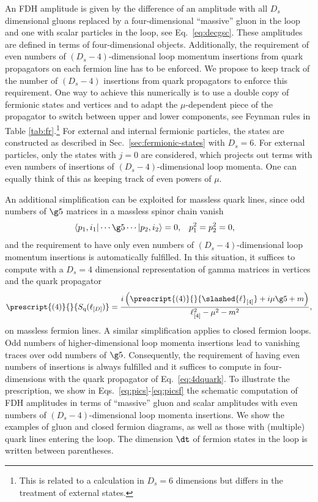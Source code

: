 An FDH amplitude is given by the difference
of an amplitude with all $D_s$ dimensional gluons replaced by a four-dimensional
``massive'' gluon in the loop and one
with scalar particles in the loop, see Eq.~\eqref{eq:decgsc}. These amplitudes are defined in
terms of four-dimensional objects. Additionally, the requirement of even numbers of $(D_s-4)$-dimensional loop momentum insertions
from quark propagators on each fermion line has to be enforced. We propose to
keep track of the number of $(D_s-4)$ insertions from quark
propagators to enforce this requirement. One way to achieve this
numerically is to use a double copy of fermionic states and vertices
and to adapt the $\mu$-dependent piece of the propagator to switch
between upper and lower components, see Feynman rules in Table \ref{tab:fr}.\footnote{This
  is related to a calculation in $D_s=6$ dimensions but
  differs in the treatment of external states.} For external and
  internal fermionic particles, the states are constructed as described in
  Sec.~\ref{sec:fermionic-states} with $D_s=6$. For external particles, only the states
with \dttindex{} $j=0$ are considered, which projects out terms with even numbers
of insertions of $(D_s-4)$-dimensional loop momenta. One can equally
think of this as keeping track of even powers of $\mu$.


An additional simplification can be
exploited for massless quark lines, since odd numbers of $\g5$ matrices in a massless spinor
chain vanish
\begin{align}\label{eq:masslesssim}
  \langle p_1,i_1|\cdots \g5 \cdots | p_2,i_2\rangle &= 0, &
  p_1^2&=p_2^2=0,
\end{align}
and the requirement to have only even numbers of $(D_s-4)$-dimensional loop momentum insertions is automatically
fulfilled. In this situation, it suffices to compute with a $D_s=4$
dimensional representation of gamma matrices in vertices and the quark propagator 
\begin{align}\label{eq:4dquark}
\prescript{(4)}{}{ S_{\text{q}}(\ell_{[D]})}= \frac{i\left(\prescript{(4)}{}{\slashed{\ell}_{[4]}} + i\mu \g5 + m\right)}{\ell_{[4]}^2-\mu^2-m^2},
\end{align}
on massless fermion lines. A similar simplification applies to closed fermion
  loops. Odd numbers of higher-dimensional loop momenta insertions
  lead to vanishing traces over odd numbers of $\g5$. Consequently,
  the requirement of having even numbers of insertions is always
  fulfilled and it
  suffices to compute in four-dimensions with the quark propagator of
  Eq.~\eqref{eq:4dquark}. To illustrate the prescription, we show in
Eqs.~\eqref{eq:pics}-\eqref{eq:picsf} the schematic computation of FDH amplitudes in terms of ``massive'' gluon
  and scalar amplitudes with even numbers of $(D_s-4)$-dimensional loop
  momenta insertions. We show the examples of gluon and closed fermion
  diagrams, as well as those with (multiple) quark lines entering the loop. The dimension $\dt$ of fermion states in the loop is written between parentheses. 

